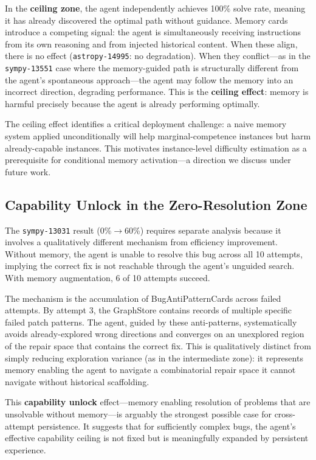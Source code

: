 \documentclass{article}
\begin{document}
In the \textbf{ceiling zone}, the agent independently achieves 100\% solve rate, meaning it has already discovered the optimal path without guidance. Memory cards introduce a competing signal: the agent is simultaneously receiving instructions from its own reasoning and from injected historical content. When these align, there is no effect (\texttt{astropy-14995}: no degradation). When they conflict---as in the \texttt{sympy-13551} case where the memory-guided path is structurally different from the agent's spontaneous approach---the agent may follow the memory into an incorrect direction, degrading performance. This is the \textbf{ceiling effect}: memory is harmful precisely because the agent is already performing optimally.

The ceiling effect identifies a critical deployment challenge: a naive memory system applied unconditionally will help marginal-competence instances but harm already-capable instances. This motivates instance-level difficulty estimation as a prerequisite for conditional memory activation---a direction we discuss under future work.

\subsection{Capability Unlock in the Zero-Resolution Zone}
\label{sec:unlock}

The \texttt{sympy-13031} result (0\%$\to$60\%) requires separate analysis because it involves a qualitatively different mechanism from efficiency improvement. Without memory, the agent is unable to resolve this bug across all 10 attempts, implying the correct fix is not reachable through the agent's unguided search. With memory augmentation, 6 of 10 attempts succeed.

The mechanism is the accumulation of BugAntiPatternCards across failed attempts. By attempt 3, the GraphStore contains records of multiple specific failed patch patterns. The agent, guided by these anti-patterns, systematically avoids already-explored wrong directions and converges on an unexplored region of the repair space that contains the correct fix. This is qualitatively distinct from simply reducing exploration variance (as in the intermediate zone): it represents memory enabling the agent to navigate a combinatorial repair space it cannot navigate without historical scaffolding.

This \textbf{capability unlock} effect---memory enabling resolution of problems that are unsolvable without memory---is arguably the strongest possible case for cross-attempt persistence. It suggests that for sufficiently complex bugs, the agent's effective capability ceiling is not fixed but is meaningfully expanded by persistent experience.
\end{document}
